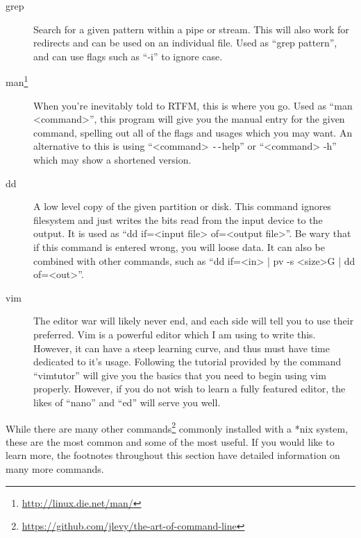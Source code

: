 \begin{description}
			\item[grep]
				Search for a given pattern within a pipe or stream. 
				This will also work for redirects and can be used on an individual file. 
				Used as ``grep pattern'', and can use flags such as ``-i'' to ignore case. 
			\item[man\footnote{\url{http://linux.die.net/man/}}]
				When you're inevitably told to RTFM, this is where you go. 
				Used as ``man <command>'', this program will give you the manual entry for the given command, spelling out all of the flags and usages which you may want. 
				An alternative to this is using ``<command> \verb+--+help'' or ``<command> -h'' which may show a shortened version. 
			\item[dd]
				A low level copy of the given partition or disk. 
				This command ignores filesystem and just writes the bits read from the input device to the output. 
				It is used as ``dd if=<input file> of=<output file>''.
				Be wary that if this command is entered wrong, you will loose data. 
				It can also be combined with other commands, such as ``dd if=<in> | pv -s <size>G | dd of=<out>''.
			\item[vim]
				The editor war will likely never end, and each side will tell you to use their preferred. 
				Vim is a powerful editor which I am using to write this. 
				However, it can have a steep learning curve, and thus must have time dedicated to it's usage. 
				Following the tutorial provided by the command ``vimtutor'' will give you the basics that you need to begin using vim properly. 
				However, if you do not wish to learn a fully featured editor, the likes of ``nano'' and ``ed'' will serve you well. 
		\end{description}
		While there are many other commands\footnote{\url{https://github.com/jlevy/the-art-of-command-line}} commonly installed with a \**nix system, these are the most common and some of the most useful. If you would like to learn more, the footnotes throughout this section have detailed information on many more commands. 

